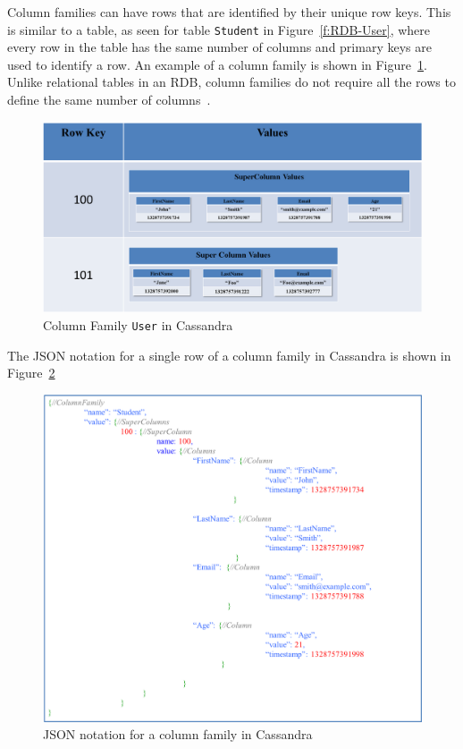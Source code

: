 \begin{description}
Column families can have rows %
that are identified by their unique row keys.  This is similar to a table,   as
seen for table \texttt{Student} in Figure~\ref{f:RDB-User},   where every row in
the table has the same number of columns and primary keys are used to identify a
row.  An example of a column family is shown in Figure~\ref{f:columnfamilyUSER}.
Unlike relational tables in an \ac{RDB},   column families do not require all
the rows to define the same number of columns~\citep{datastaxDataModel,BOOK}.

\begin{figure}[H]
	\centering
	\includegraphics[width=.8\textwidth]{./figure/Example/ColumnFamily-User-DiffColumns.png}
	\caption{Column Family \texttt{User} in Cassandra}\label{f:columnfamilyUSER}
\end{figure}

The JSON notation for a single row of a column family in Cassandra is
shown in Figure~\ref{f:columnfamilyJSON} 

\begin{figure}[H]
	\centering
	\includegraphics[width=.7\textwidth]{./figure/Example/JSON_ColumnFamily_1row.png}
	\caption{JSON notation for a column family in
	Cassandra}\label{f:columnfamilyJSON}
\end{figure}


\end{description}
